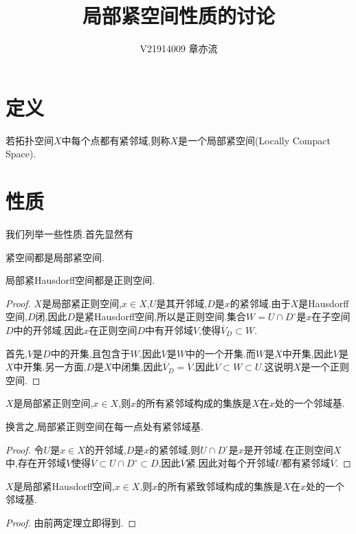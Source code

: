 \documentclass{article}
\title{局部紧空间性质的讨论}
\author{V21914009 章亦流}
\begin{document}
\maketitle
\tableofcontents

\section{定义}
\begin{definition}
    若拓扑空间$X$中每个点都有紧邻域,则称$X$是一个局部紧空间(Locally Compact Space).
\end{definition}

\section{性质}
我们列举一些性质.首先显然有
\begin{theorem}
    紧空间都是局部紧空间.
\end{theorem}
\begin{theorem}
    局部紧Hausdorff空间都是正则空间.
\end{theorem}
\begin{proof}
    $X$是局部紧正则空间,$x\in X$,$U$是其开邻域,$D$是$x$的紧邻域.由于$X$是Hausdorff空间,$D$闭,因此$D$是紧Hausdorff空间,所以是正则空间.集合$W=U\cap D^\circ$是$x$在子空间$D$中的开邻域,因此$x$在正则空间$D$中有开邻域$V$,使得$\overline{V}_D\subset W$.

    首先,$V$是$D$中的开集,且包含于$W$,因此$V$是$W$中的一个开集.而$W$是$X$中开集,因此$V$是$X$中开集.另一方面,$D$是$X$中闭集,因此$\overline{V}_D=\overline{V}$.因此$\overline{V}\subset W\subset U$.这说明$X$是一个正则空间.
\end{proof}
\begin{lemma}
    $X$是局部紧正则空间,$x\in X$,则$x$的所有紧邻域构成的集族是$X$在$x$处的一个邻域基.
    
    换言之,局部紧正则空间在每一点处有紧邻域基.
\end{lemma}
\begin{proof}
    令$U$是$x\in X$的开邻域,$D$是$x$的紧邻域,则$U\cap D^\circ$是$x$是开邻域.在正则空间$X$中,存在开邻域$V$使得$\overline{V}\subset U\cap D^\circ\subset D$,因此$\overline{V}$紧.因此对每个开邻域$U$都有紧邻域$\overline{V}$.
\end{proof}
\begin{theorem}
    $X$是局部紧Hausdorff空间,$x\in X$,则$x$的所有紧致邻域构成的集族是$X$在$x$处的一个邻域基.
\end{theorem}
\begin{proof}
    由前两定理立即得到.
\end{proof}
\end{document}
